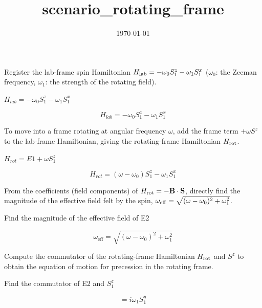 \documentclass[dvipdfmx]{article}
\title{scenario\_rotating\_frame}
\date{\today}
\begin{document}
\maketitle

Register the lab-frame spin Hamiltonian $H_{\rm lab}=-\omega_0S^z_1-\omega_1S^x_1$ ($\omega_0$: the Zeeman frequency, $\omega_1$: the strength of the rotating field).

$H_{lab} = -\omega_0 S^z_1 - \omega_1 S^x_1$

\begin{equation}
  H_{lab} = -\omega_0 S^{z}_{1} - \omega_1 S^{x}_{1}
  \label{eq:E1}
\end{equation}

To move into a frame rotating at angular frequency $\omega$, add the frame term $+\omega S^z$ to the lab-frame Hamiltonian, giving the rotating-frame Hamiltonian $H_{\rm rot}$.

$H_{rot} = E1 + \omega S^z_1$

\begin{equation}
  H_{rot} = \left( \omega - \omega_0 \right) S^{z}_{1} - \omega_1 S^{x}_{1}
  \label{eq:E2}
\end{equation}

From the coefficients (field components) of $H_{\rm rot}=-\mathbf B\cdot\mathbf S$, directly find the magnitude of the effective field felt by the spin, $\omega_{\rm eff}=\sqrt{(\omega-\omega_0)^2+\omega_1^2}$.

Find the magnitude of the effective field of E2

\begin{equation}
  \omega_{\mathrm{eff}} = \sqrt{ \left(\omega - \omega_0\right)^2 + \omega_1^2 }
  \label{eq:E3}
\end{equation}

Compute the commutator of the rotating-frame Hamiltonian $H_{\rm rot}$ and $S^z$ to obtain the equation of motion for precession in the rotating frame.

Find the commutator of E2 and $S^z_1$

\begin{equation}
  [H_{rot}, S^z_1] = i \omega_1 S^{y}_{1}
  \label{eq:E4}
\end{equation}
\end{document}

